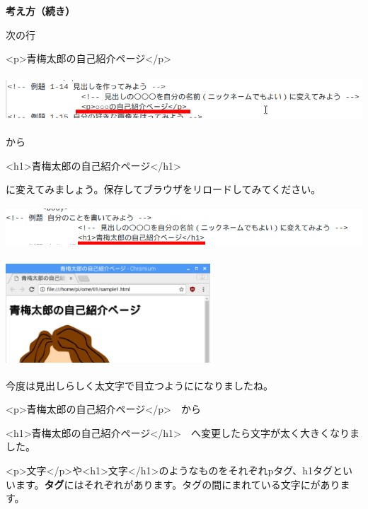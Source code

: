 \documentclass[a4paper,12pt]{jarticle}
\begin{document}
\clearpage
\flushleft
\textbf{考え方（続き）}




次の行

{\textless}p{\textgreater}青梅太郎の自己紹介ページ{\textless}/p{\textgreater}

\bigskip

\includegraphics[width=16.217cm,height=1.739cm]{textbook-img158.png}

から

{\textless}h1{\textgreater}青梅太郎の自己紹介ページ{\textless}/h1{\textgreater}

に変えてみましょう。保存してブラウザをリロードしてみてください。


\bigskip

\includegraphics[width=15.18cm,height=1.528cm]{textbook-img157.png}


\bigskip


\bigskip

\includegraphics[width=7.638cm,height=3.939cm]{textbook-img156.png}


今度は見出しらしく太文字で目立つようにになりましたね。




\bigskip

{\textless}p{\textgreater}青梅太郎の自己紹介ページ{\textless}/p{\textgreater}　から

{\textless}h1{\textgreater}青梅太郎の自己紹介ページ{\textless}/h1{\textgreater}　へ変更したら文字が太く大きくなりました。


\bigskip

{\textless}p{\textgreater}文字{\textless}/p{\textgreater}や{\textless}h1{\textgreater}文字{\textless}/h1{\textgreater}のようなものをそれぞれpタグ、h1タグといいます。\textbf{タグ}にはそれぞれがあります。タグの間にまれている文字にがあります。
\end{document}
